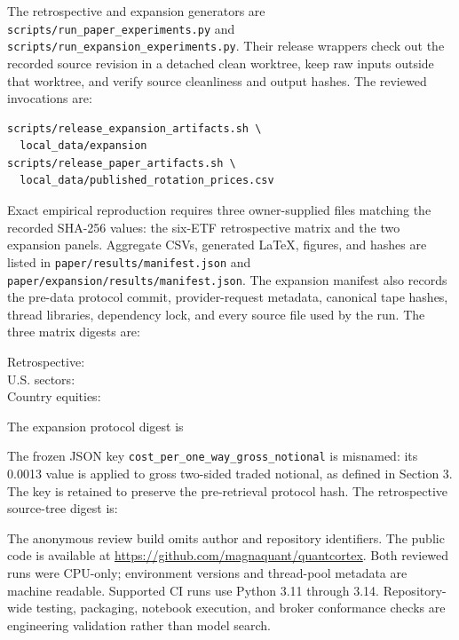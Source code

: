 \documentclass{article}
\begin{document}
The retrospective and expansion generators are
\texttt{scripts/run\_paper\_experiments.py} and
\texttt{scripts/run\_expansion\_experiments.py}. Their release wrappers check
out the recorded source revision in a detached clean worktree, keep raw inputs
outside that worktree, and verify source cleanliness and output hashes. The
reviewed invocations are:
\begin{verbatim}
scripts/release_expansion_artifacts.sh \
  local_data/expansion
scripts/release_paper_artifacts.sh \
  local_data/published_rotation_prices.csv
\end{verbatim}
Exact empirical reproduction requires three owner-supplied files matching the
recorded SHA-256 values: the six-ETF retrospective matrix and the two expansion
panels. Aggregate CSVs, generated LaTeX, figures, and hashes are listed in
\texttt{paper/results/manifest.json} and
\texttt{paper/expansion/results/manifest.json}. The expansion manifest also
records the pre-data protocol commit, provider-request metadata, canonical tape
hashes, thread libraries, dependency lock, and every source file used by the
run. The three matrix digests are:
\begin{center}
  \scriptsize
  Retrospective: \texttt{\PaperInputDigest}\\
  U.S. sectors: \texttt{\ExpansionSectorInputDigest}\\
  Country equities: \texttt{\ExpansionCountryInputDigest}
\end{center}
The expansion protocol digest is
\begin{center}
  \scriptsize\texttt{\ExpansionProtocolDigest}
\end{center}
The frozen JSON key
\texttt{cost\_per\_one\_way\_gross\_notional} is misnamed: its 0.0013 value is
applied to gross two-sided traded notional, as defined in Section 3. The key is
retained to preserve the pre-retrieval protocol hash. The retrospective
source-tree digest is:
\begin{center}
  \scriptsize\texttt{\PaperSourceTreeDigest}
\end{center}
\ifdefined\quantcortexanonymous
The anonymous review build omits author and repository identifiers.
\else
The public code is available at
\url{https://github.com/magnaquant/quantcortex}.
\fi
Both reviewed runs were CPU-only; environment versions and thread-pool metadata
are machine readable. Supported CI runs use Python 3.11 through 3.14.
Repository-wide testing, packaging, notebook execution, and broker conformance
checks are engineering validation rather than model search.
\end{document}

